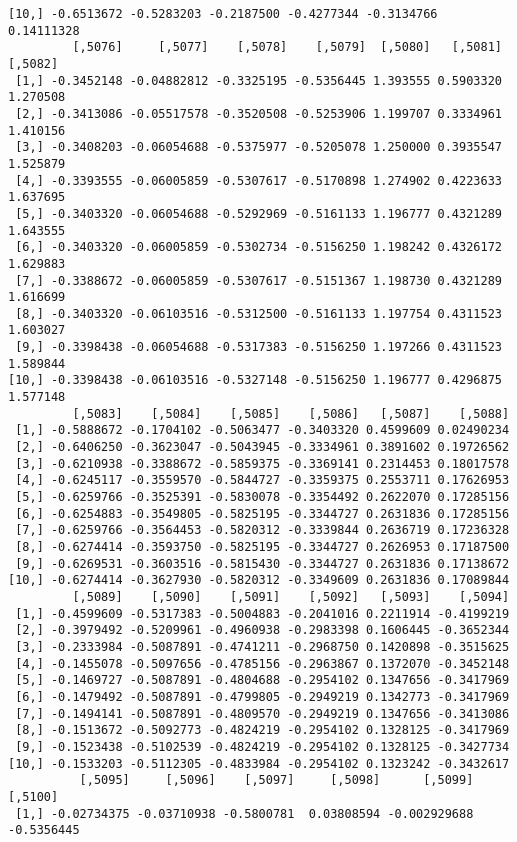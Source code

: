 \documentclass[
  letterpaper,
  DIV=11,
  numbers=noendperiod]{scrreprt}
\begin{document}
\begin{verbatim}
[10,] -0.6513672 -0.5283203 -0.2187500 -0.4277344 -0.3134766 0.14111328
         [,5076]     [,5077]    [,5078]    [,5079]  [,5080]   [,5081]  [,5082]
 [1,] -0.3452148 -0.04882812 -0.3325195 -0.5356445 1.393555 0.5903320 1.270508
 [2,] -0.3413086 -0.05517578 -0.3520508 -0.5253906 1.199707 0.3334961 1.410156
 [3,] -0.3408203 -0.06054688 -0.5375977 -0.5205078 1.250000 0.3935547 1.525879
 [4,] -0.3393555 -0.06005859 -0.5307617 -0.5170898 1.274902 0.4223633 1.637695
 [5,] -0.3403320 -0.06054688 -0.5292969 -0.5161133 1.196777 0.4321289 1.643555
 [6,] -0.3403320 -0.06005859 -0.5302734 -0.5156250 1.198242 0.4326172 1.629883
 [7,] -0.3388672 -0.06005859 -0.5307617 -0.5151367 1.198730 0.4321289 1.616699
 [8,] -0.3403320 -0.06103516 -0.5312500 -0.5161133 1.197754 0.4311523 1.603027
 [9,] -0.3398438 -0.06054688 -0.5317383 -0.5156250 1.197266 0.4311523 1.589844
[10,] -0.3398438 -0.06103516 -0.5327148 -0.5156250 1.196777 0.4296875 1.577148
         [,5083]    [,5084]    [,5085]    [,5086]   [,5087]    [,5088]
 [1,] -0.5888672 -0.1704102 -0.5063477 -0.3403320 0.4599609 0.02490234
 [2,] -0.6406250 -0.3623047 -0.5043945 -0.3334961 0.3891602 0.19726562
 [3,] -0.6210938 -0.3388672 -0.5859375 -0.3369141 0.2314453 0.18017578
 [4,] -0.6245117 -0.3559570 -0.5844727 -0.3359375 0.2553711 0.17626953
 [5,] -0.6259766 -0.3525391 -0.5830078 -0.3354492 0.2622070 0.17285156
 [6,] -0.6254883 -0.3549805 -0.5825195 -0.3344727 0.2631836 0.17285156
 [7,] -0.6259766 -0.3564453 -0.5820312 -0.3339844 0.2636719 0.17236328
 [8,] -0.6274414 -0.3593750 -0.5825195 -0.3344727 0.2626953 0.17187500
 [9,] -0.6269531 -0.3603516 -0.5815430 -0.3344727 0.2631836 0.17138672
[10,] -0.6274414 -0.3627930 -0.5820312 -0.3349609 0.2631836 0.17089844
         [,5089]    [,5090]    [,5091]    [,5092]   [,5093]    [,5094]
 [1,] -0.4599609 -0.5317383 -0.5004883 -0.2041016 0.2211914 -0.4199219
 [2,] -0.3979492 -0.5209961 -0.4960938 -0.2983398 0.1606445 -0.3652344
 [3,] -0.2333984 -0.5087891 -0.4741211 -0.2968750 0.1420898 -0.3515625
 [4,] -0.1455078 -0.5097656 -0.4785156 -0.2963867 0.1372070 -0.3452148
 [5,] -0.1469727 -0.5087891 -0.4804688 -0.2954102 0.1347656 -0.3417969
 [6,] -0.1479492 -0.5087891 -0.4799805 -0.2949219 0.1342773 -0.3417969
 [7,] -0.1494141 -0.5087891 -0.4809570 -0.2949219 0.1347656 -0.3413086
 [8,] -0.1513672 -0.5092773 -0.4824219 -0.2954102 0.1328125 -0.3417969
 [9,] -0.1523438 -0.5102539 -0.4824219 -0.2954102 0.1328125 -0.3427734
[10,] -0.1533203 -0.5112305 -0.4833984 -0.2954102 0.1323242 -0.3432617
          [,5095]     [,5096]    [,5097]     [,5098]      [,5099]    [,5100]
 [1,] -0.02734375 -0.03710938 -0.5800781  0.03808594 -0.002929688 -0.5356445

\end{verbatim}
\end{document}

